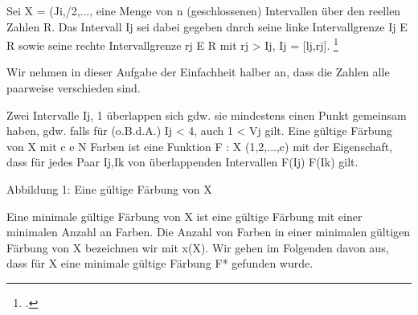 \documentclass{bschlangaul-aufgabe}
\begin{document}

Sei X = (Ji,/2,..., eine Menge von n (geschlossenen) Intervallen über
den reellen Zahlen R. Das Intervall Ij sei dabei gegeben dnrch seine
linke Intervallgrenze Ij E R sowie seine rechte Intervallgrenze rj E R
mit rj > Ij, \dh Ij = [lj,rj].
\footcite[Thema 1 Aufgabe 8]{examen:66115:2017:09}

Wir nehmen in dieser Aufgabe der Einfachheit halber an, dass die Zahlen
alle paarweise verschieden sind.

Zwei Intervalle Ij, 1 überlappen sich gdw. sie mindestens einen Punkt
gemeinsam haben, \dh gdw. falls für (o.B.d.A.) Ij < 4, auch 1 < Vj
gilt. Eine gültige Färbung von X mit c e N Farben ist eine Funktion F :
X  (1,2,...,c) mit der Eigenschaft, dass für jedes Paar Ij,Ik von
überlappenden Intervallen F(Ij)  F(Ik) gilt.

Abbildung 1: Eine gültige Färbung von X

Eine minimale gültige Färbung von X ist eine gültige Färbung mit einer
minimalen Anzahl an Farben. Die Anzahl von Farben in einer minimalen
gültigen Färbung von X bezeichnen wir mit x(X). Wir gehen im Folgenden
davon aus, dass für X eine minimale gültige Färbung F* gefunden wurde.
\end{document}
